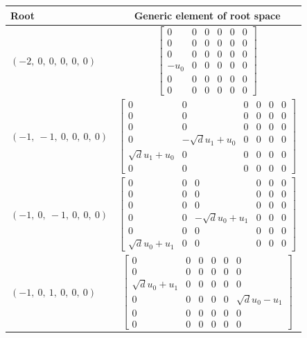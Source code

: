 \documentclass[11pt]{article}
\theoremstyle{definition}
\begin{document}
\noindent \begin{longtable}{|l|c|}
    \hline
    \textbf{Root} & \textbf{Generic element of root space} \\
    \hline
    \endhead
    $\left( -2, \  0, \  0, \  0, \  0, \  0\right)$ & ${\left[\begin{matrix}0 & 0 & 0 & 0 & 0 & 0\\0 & 0 & 0 & 0 & 0 & 0\\0 & 0 & 0 & 0 & 0 & 0\\- u_{0} & 0 & 0 & 0 & 0 & 0\\0 & 0 & 0 & 0 & 0 & 0\\0 & 0 & 0 & 0 & 0 & 0\end{matrix}\right]}$ \\
    \hline
    $\left( -1, \  -1, \  0, \  0, \  0, \  0\right)$ & ${\left[\begin{matrix}0 & 0 & 0 & 0 & 0 & 0\\0 & 0 & 0 & 0 & 0 & 0\\0 & 0 & 0 & 0 & 0 & 0\\0 & - \sqrt{d} u_{1} + u_{0} & 0 & 0 & 0 & 0\\\sqrt{d} u_{1} + u_{0} & 0 & 0 & 0 & 0 & 0\\0 & 0 & 0 & 0 & 0 & 0\end{matrix}\right]}$ \\
    \hline
    $\left( -1, \  0, \  -1, \  0, \  0, \  0\right)$ & ${\left[\begin{matrix}0 & 0 & 0 & 0 & 0 & 0\\0 & 0 & 0 & 0 & 0 & 0\\0 & 0 & 0 & 0 & 0 & 0\\0 & 0 & - \sqrt{d} u_{0} + u_{1} & 0 & 0 & 0\\0 & 0 & 0 & 0 & 0 & 0\\\sqrt{d} u_{0} + u_{1} & 0 & 0 & 0 & 0 & 0\end{matrix}\right]}$ \\
    \hline
    $\left( -1, \  0, \  1, \  0, \  0, \  0\right)$ & ${\left[\begin{matrix}0 & 0 & 0 & 0 & 0 & 0\\0 & 0 & 0 & 0 & 0 & 0\\\sqrt{d} u_{0} + u_{1} & 0 & 0 & 0 & 0 & 0\\0 & 0 & 0 & 0 & 0 & \sqrt{d} u_{0} - u_{1}\\0 & 0 & 0 & 0 & 0 & 0\\0 & 0 & 0 & 0 & 0 & 0\end{matrix}\right]}$ \\

\end{longtable}
\end{document}
